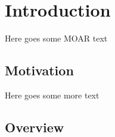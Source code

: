 \documentclass[../Thesis_AHoecherl.tex]{subfiles}
\begin{document}
    \section{Introduction}
    Here goes some MOAR text
    \subsection{Motivation}
    Here goes some more text
    \subsection{Overview}
\end{document}
